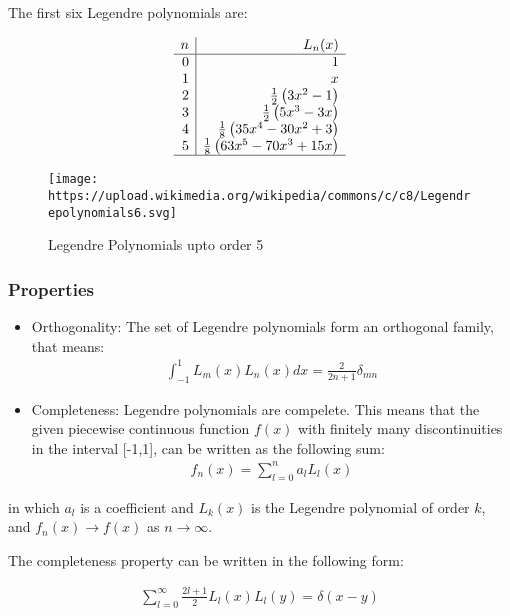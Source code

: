 \documentclass[
]{scrartcl}
\begin{document}
The first six Legendre polynomials are:

\[
\begin{array}{r|r}
 n & L_n(x) \\
\hline
 0 & 1 \\ 
 1 & x \\
 2 & \tfrac12 \left(3x^2-1\right) \\
 3 & \tfrac12 \left(5x^3-3x\right) \\
 4 & \tfrac18 \left(35x^4-30x^2+3\right) \\
 5 & \tfrac18 \left(63x^5-70x^3+15x\right) \\
\hline
\end{array}
\]

\begin{figure}
\centering
\texttt{[image: https://upload.wikimedia.org/wikipedia/commons/c/c8/Legendrepolynomials6.svg]}
\caption{Legendre Polynomials upto order 5}
\end{figure}

\hypertarget{properties}{%
\subsubsection{Properties}\label{properties}}

\begin{itemize}
\item
  Orthogonality: The set of Legendre polynomials form an orthogonal
  family, that means: \begin{align}
  \int_{-1}^1 L_m(x)L_n(x) dx = \frac{2}{2n+1}\delta_{mn} 
  \end{align}
\item
  Completeness: Legendre polynomials are compelete. This means that the
  given piecewise continuous function \(f(x)\) with finitely many
  discontinuities in the interval {[}-1,1{]}, can be written as the
  following sum: \begin{align}
  f_n(x)=\sum_{l=0}^{n}a_lL_l(x)
  \end{align}
\end{itemize}

in which \(a_l\) is a coefficient and \(L_k(x)\) is the Legendre
polynomial of order \(k\), and \(f_n(x) \to f(x)\) as \(n \to \infty\).

The completeness property can be written in the following form:

\begin{align}
\sum_{l=0}^{\infty}\frac{2l+1}{2}L_l(x)L_l(y) = \delta(x-y)
\end{align}
\end{document}
